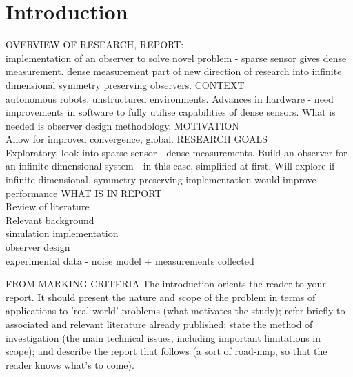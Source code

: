 \chapter{Introduction}
OVERVIEW OF RESEARCH, REPORT:\\
	implementation of an observer to solve novel problem - sparse sensor gives dense measurement.
	dense measurement part of new direction of research into infinite dimensional symmetry preserving observers.
CONTEXT\\
	autonomous robots, unstructured environments. Advances in hardware - need improvements in software to fully utilise capabilities of dense sensors.
	What is needed is observer design methodology.
MOTIVATION\\
	Allow for improved convergence, global. 
RESEARCH GOALS\\
	Exploratory, look into sparse sensor - dense measurements. Build an observer for an infinite dimensional system - in this case, simplified at first. Will explore if infinite dimensional, symmetry preserving implementation would improve performance
WHAT IS IN REPORT\\
	Review of literature\\
	Relevant background\\
	simulation implementation\\
	observer design\\
	experimental data - noise model + measurements collected


FROM MARKING CRITERIA
The introduction orients the reader to your report. It should present the
nature and scope of the problem in terms of applications to 'real world'
problems (what motivates the study); refer briefly to associated and
relevant literature already published; state the method of investigation (the
main technical issues, including important limitations in scope); and
describe the report that follows (a sort of road-map, so that the reader
knows what's to come).

